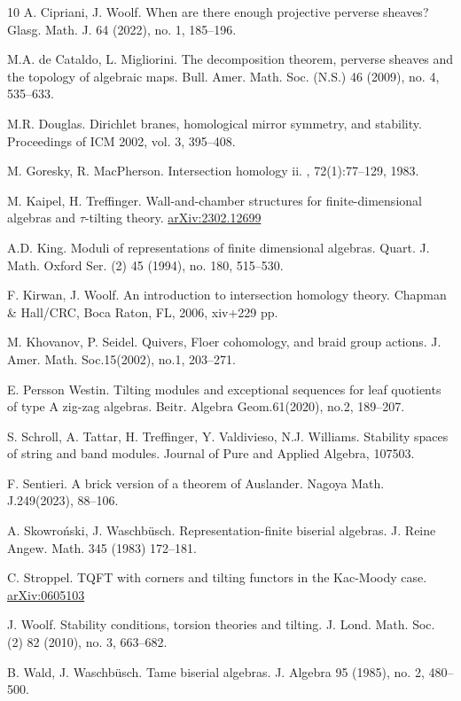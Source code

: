 \documentclass[11pt]{amsart}
\theoremstyle{definition}
\begin{document}
\begin{thebibliography}{10}
A. Cipriani, J. Woolf.
\newblock When are there enough projective perverse sheaves?
\newblock Glasg. Math. J. 64 (2022), no. 1, 185--196.

M.A. de Cataldo, L. Migliorini.
\newblock The decomposition theorem, perverse sheaves and the topology of algebraic maps.
\newblock Bull. Amer. Math. Soc. (N.S.) 46 (2009), no. 4, 535--633.

M.R. Douglas.
\newblock Dirichlet branes, homological mirror symmetry, and stability.
\newblock Proceedings of ICM 2002, vol. 3, 395--408.

M. Goresky, R. MacPherson.
\newblock Intersection homology ii.
, 72(1):77--129, 1983.

M. Kaipel, H. Treffinger.
\newblock Wall-and-chamber structures for finite-dimensional algebras and $\tau$-tilting theory.
\newblock \href{https://arxiv.org/pdf/2302.12699.pdf}{arXiv:2302.12699}

A.D. King.
\newblock Moduli of representations of finite dimensional algebras. 
\newblock Quart. J. Math. Oxford Ser. (2) 45 (1994), no. 180, 515--530.

F. Kirwan, J. Woolf.
\newblock An introduction to intersection homology theory.
\newblock Chapman \& Hall/CRC, Boca Raton, FL, 2006, xiv+229 pp.

M. Khovanov, P. Seidel.
\newblock Quivers, Floer cohomology, and braid group actions.
\newblock J. Amer. Math. Soc.15(2002), no.1, 203--271.

E. Persson Westin.
\newblock
Tilting modules and exceptional sequences for leaf quotients of type A zig-zag algebras.
\newblock
Beitr. Algebra Geom.61(2020), no.2, 189--207.


S. Schroll, A. Tattar, H. Treffinger, Y. Valdivieso, N.J. Williams.
\newblock Stability spaces of string and band modules. 
\newblock 
Journal of Pure and Applied Algebra, 107503.

F. Sentieri.
\newblock A brick version of a theorem of Auslander.
\newblock Nagoya Math. J.249(2023), 88--106.

A. Skowro\'nski, J. Waschb\"usch.
\newblock Representation-finite biserial algebras.
\newblock J. Reine Angew. Math. 345 (1983) 172--181.

C. Stroppel.
\newblock TQFT with corners and tilting functors in the Kac-Moody case.
\newblock \href{https://arxiv.org/abs/math/0605103}{arXiv:0605103}

J. Woolf.
\newblock Stability conditions, torsion theories and tilting. 
\newblock J. Lond. Math. Soc. (2) 82 (2010), no. 3, 663--682. 

B. Wald, J. Waschb\"{u}sch.
\newblock Tame biserial algebras.
\newblock J. Algebra 95 (1985), no. 2, 480--500. 

\end{thebibliography}
\end{document}
